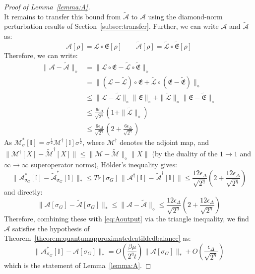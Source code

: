 \documentclass[aps,floatfix,10pt,amssymb,amsfont,amsmath,superscriptaddress,float,nofootinbib,longbibliography,nobalancelastpage,twocolumn]{revtex4-2}
\begin{document}
\begin{proof}[Proof of Lemma~\ref{lemma:A}]
\begin{equation}
    \label{eq:Aoutput}
\end{equation}
It remains to transfer this bound from $\tilde{\mathcal{A}}$ to $\mathcal{A}$ using the diamond-norm perturbation results of Section~\ref{subsec:transfer}.
Further, we can write $\mathcal{A}$ and $\tilde{\mathcal{A}}$ as:
\begin{equation}
    \mathcal{A}[\rho] = \mathcal{L} \circ \mathfrak{E} [\rho] \qquad  \tilde{\mathcal{A}}[\rho] = \tilde{\mathcal{L}} \circ \tilde{\mathfrak{E}} [\rho]
\end{equation}
Therefore, we can write:
\begin{align}
    \|\mathcal{A} - \tilde{\mathcal{A}}\|_{\diamond} &= \|\mathcal{L} \circ \mathfrak{E} - \tilde{\mathcal{L}} \circ \tilde{\mathfrak{E}}\|_{\diamond}\\
    &=\|(\mathcal{L}-\tilde{\mathcal{L}}) \circ \mathfrak{E} + \tilde{\mathcal{L}} \circ (\mathfrak{E}-\tilde{\mathfrak{E}})\|_{\diamond}\\
    &\leq\|\mathcal{L}-\tilde{\mathcal{L}}\|_{\diamond} \|\mathfrak{E} \|_{\diamond}+ \|\tilde{\mathcal{L}}\|_{\diamond} \|\mathfrak{E}-\tilde{\mathfrak{E}}\|_{\diamond}\\
    &\leq \frac{6\epsilon_{\Delta}}{\sqrt{2^{\eta}}}(1+\|\tilde{\mathcal{L}}\|_{\diamond})\\
    &\leq \frac{6\epsilon_{\Delta}}{\sqrt{2^{\eta}}}(2+\frac{6\epsilon_{\Delta}}{\sqrt{2^{\eta}}})
\end{align}
As $\mathcal{M}^*_{\sigma}[\mathbb{I}] = \sigma^{\frac{1}{2}}\mathcal{M}^{\dagger}[\mathbb{I}]\sigma^{\frac{1}{2}}$, where $\mathcal{M}^{\dagger}$ denotes the adjoint map, and $\|\mathcal{M}^{\dagger}[X] - \tilde{\mathcal{M}}^{\dagger}[X]\| \leq \|\mathcal{M}-\tilde{\mathcal{M}}\|_{\diamond}\|X\|$ (by the duality of the $1\to1$ and $\infty\to\infty$ superoperator norms), H\"older's inequality gives:
\begin{equation}
    \|\mathcal{A}^*_{\sigma_G}[\mathbb{I}] - \tilde{\mathcal{A}}^*_{\sigma_G}[\mathbb{I}]\|_* \leq Tr[\sigma_G]\,\|\mathcal{A}^{\dagger}[\mathbb{I}] - \tilde{\mathcal{A}}^{\dagger}[\mathbb{I}]\| \leq \frac{12\epsilon_{\Delta}}{\sqrt{2^{\eta}}}(2+\frac{12\epsilon_{\Delta}}{\sqrt{2^{\eta}}})
\end{equation}
and directly:
\begin{equation}
    \|\mathcal{A}[\sigma_G] - \tilde{\mathcal{A}}[\sigma_G]\|_* \leq \|\mathcal{A}-\tilde{\mathcal{A}}\|_{\diamond} \leq \frac{12\epsilon_{\Delta}}{\sqrt{2^{\eta}}}(2+\frac{12\epsilon_{\Delta}}{\sqrt{2^{\eta}}})
\end{equation}
Therefore, combining these with \eqref{eq:Aoutput} via the triangle inequality, we find $\mathcal{A}$ satisfies the hypothesis of Theorem~\ref{theorem:quantumapproximatedeatildedbalance} as:
\begin{equation}
    \|\mathcal{A}^*_{\sigma_G}[\mathbb{I}] - \mathcal{A}[\sigma_G]\|_* = O\!\left(\frac{\beta\mu}{2^{\eta}t}\right)\|\mathcal{A}[\sigma_G]\|_* + O\!\left(\frac{\epsilon_{\Delta}}{\sqrt{2^{\eta}}}\right)
\end{equation}
which is the statement of Lemma~\ref{lemma:A}.
\end{proof}
\end{document}
